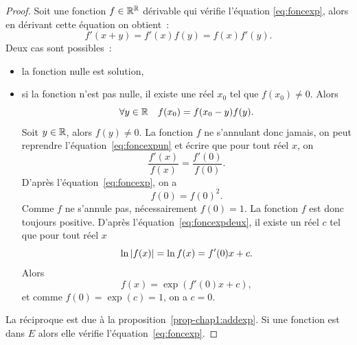 \begin{proof}
    Soit une fonction \(f \in \mathbb{R}^{\mathbb{R}}\) dérivable qui vérifie l'équation 
    \eqref{eq:foncexp}, alors en dérivant cette équation on obtient~:
    \begin{equation}
        \label{eq:foncexpun}
        f'(x+y)=f'(x)f(y)=f(x)f'(y).
    \end{equation}
    Deux cas sont possibles~:
    \begin{itemize}
        \item la fonction nulle est solution,
        \item si la fonction n'est pas nulle, il existe une réel \(x_0\) tel 
            que \(f(x_0) \neq 0\). Alors
            \begin{equation}
                \forall y \in \mathbb{R} \quad f(x_0)= f(x_0-y)f(y).
            \end{equation}
            Soit \(y \in \mathbb{R}\), alors \(f(y) \neq 0\). La fonction \(f\) ne 
            s'annulant donc jamais, on peut reprendre 
            l'équation~\ref{eq:foncexpun} et écrire que pour tout réel 
            \(x\), on \begin{equation}
                \label{eq:foncexpdeux}
                \frac{f'(x)}{f(x)}=\frac{f'(0)}{f(0)}.
            \end{equation}
            D'après l'équation~\ref{eq:foncexp}, on a
            \begin{equation}
                f(0)=f(0)^2.
            \end{equation}
            Comme \(f\) ne s'annule pas, nécessairement \(f(0)=1\). La 
            fonction \(f\) est donc toujours positive. D'après 
            l'équation~\eqref{eq:foncexpdeux}, il existe un réel \(c\) tel 
            que pour tout réel \(x\)
            \begin{equation}
                \ln \left\lvert f(x)\right\rvert=\ln f(x)=f'(0) x + c.
            \end{equation}
            Alors
            \begin{equation}
                f(x)=\exp(f'(0) x +c),
            \end{equation}
            et comme \(f(0)=\exp(c)=1\), on a \(c=0\).
    \end{itemize}
    La réciproque est due à la proposition~\ref{prop-chap1:addexp}. Si une 
    fonction est dans \(E\) alors elle vérifie l'équation~\ref{eq:foncexp}.
\end{proof}
